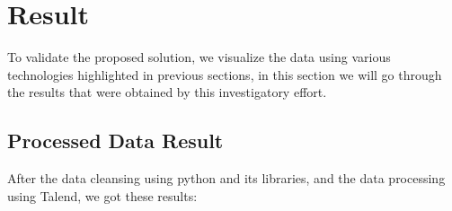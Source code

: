 \section{Result}
To validate the proposed solution, we visualize the data  using various technologies highlighted in previous sections, in this section we will go through the results that were obtained by this investigatory effort.
\subsection{Processed Data Result}
After the data cleansing using python and its libraries, and the data processing using Talend, we got these results:



